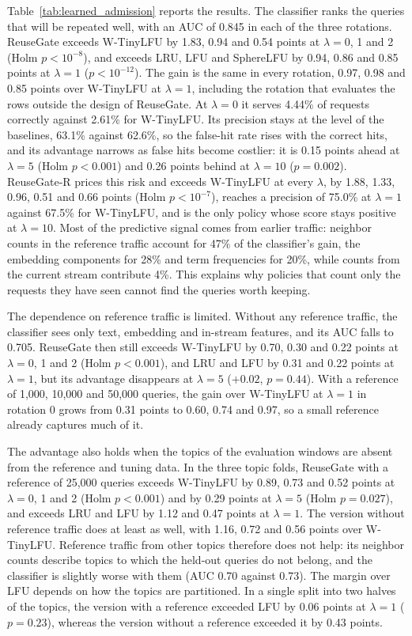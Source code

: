 \documentclass[authoryear,preprint,review,12pt]{elsarticle}
\begin{document}
Table~\ref{tab:learned_admission} reports the results. The classifier ranks the queries that will be repeated well, with an AUC of 0.845 in each of the three rotations. ReuseGate exceeds W-TinyLFU by 1.83, 0.94 and 0.54 points at $\lambda=0$, 1 and 2 (Holm $p<10^{-8}$), and exceeds LRU, LFU and SphereLFU by 0.94, 0.86 and 0.85 points at $\lambda=1$ ($p<10^{-12}$). The gain is the same in every rotation, 0.97, 0.98 and 0.85 points over W-TinyLFU at $\lambda=1$, including the rotation that evaluates the rows outside the design of ReuseGate. At $\lambda=0$ it serves 4.44\% of requests correctly against 2.61\% for W-TinyLFU. Its precision stays at the level of the baselines, 63.1\% against 62.6\%, so the false-hit rate rises with the correct hits, and its advantage narrows as false hits become costlier: it is 0.15 points ahead at $\lambda=5$ (Holm $p<0.001$) and 0.26 points behind at $\lambda=10$ ($p=0.002$). ReuseGate-R prices this risk and exceeds W-TinyLFU at every $\lambda$, by 1.88, 1.33, 0.96, 0.51 and 0.66 points (Holm $p<10^{-7}$), reaches a precision of 75.0\% at $\lambda=1$ against 67.5\% for W-TinyLFU, and is the only policy whose score stays positive at $\lambda=10$. Most of the predictive signal comes from earlier traffic: neighbor counts in the reference traffic account for 47\% of the classifier's gain, the embedding components for 28\% and term frequencies for 20\%, while counts from the current stream contribute 4\%. This explains why policies that count only the requests they have seen cannot find the queries worth keeping.

The dependence on reference traffic is limited. Without any reference traffic, the classifier sees only text, embedding and in-stream features, and its AUC falls to 0.705. ReuseGate then still exceeds W-TinyLFU by 0.70, 0.30 and 0.22 points at $\lambda=0$, 1 and 2 (Holm $p<0.001$), and LRU and LFU by 0.31 and 0.22 points at $\lambda=1$, but its advantage disappears at $\lambda=5$ ($+0.02$, $p=0.44$). With a reference of 1,000, 10,000 and 50,000 queries, the gain over W-TinyLFU at $\lambda=1$ in rotation 0 grows from 0.31 points to 0.60, 0.74 and 0.97, so a small reference already captures much of it.

The advantage also holds when the topics of the evaluation windows are absent from the reference and tuning data. In the three topic folds, ReuseGate with a reference of 25,000 queries exceeds W-TinyLFU by 0.89, 0.73 and 0.52 points at $\lambda=0$, 1 and 2 (Holm $p<0.001$) and by 0.29 points at $\lambda=5$ (Holm $p=0.027$), and exceeds LRU and LFU by 1.12 and 0.47 points at $\lambda=1$. The version without reference traffic does at least as well, with 1.16, 0.72 and 0.56 points over W-TinyLFU. Reference traffic from other topics therefore does not help: its neighbor counts describe topics to which the held-out queries do not belong, and the classifier is slightly worse with them (AUC 0.70 against 0.73). The margin over LFU depends on how the topics are partitioned. In a single split into two halves of the topics, the version with a reference exceeded LFU by 0.06 points at $\lambda=1$ ($p=0.23$), whereas the version without a reference exceeded it by 0.43 points.
\end{document}
